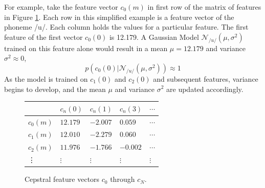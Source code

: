 \DIFdelbegin {}\DIFdelend %
For example, take the feature vector $c_0(m)$ in first row of the matrix of features in Figure \ref{fig:feat-vectors}.  Each row in this simplified example is a feature vector of the phoneme /u/.  Each column holds the values for a particular feature.  The first feature of the first vector $c_0(0)$ is 12.179.  A Gaussian Model $\mathcal{N}_{/u/}(\mu,\sigma^2)$ trained on this feature alone would result in a mean $\mu=12.179$ and variance $\sigma^2\approx 0$, \DIFdelbegin {}\DIFdelend \DIFaddbegin {}\DIFaddend \begin{equation} p(c_0(0)|\mathcal{N}_{/u/}(\mu,\sigma^2))\approx 1 \end{equation} As the model is trained on $c_1(0)$ and $c_2(0)$ and subsequent features, variance begins to develop, and the mean $\mu$ and variance $\sigma^2$ are updated accordingly.
%
\DIFdelbegin %
\DIFdelend \DIFaddbegin \begin{figure}[H]
\DIFaddendFL \begin{center}
\begin{tabular}{|p{1.5cm}|p{1.5cm}|p{1.5cm}|p{1.5cm}|p{1cm}} \hline
    & $c_n(0)$ & $c_n(1)$ & $c_n(3)$ & $\cdots$ \\ \hline
$c_0(m)$ & $12.179$ & $-2.007$ & $0.059$ & $\cdots$ \\ \hline
$c_1(m)$ & $12.010$ & $-2.279$ & $0.060$ & $\cdots$ \\ \hline
$c_2(m)$ & $11.976$ & $-1.766$ & $-0.002$ & $\cdots$ \\ \hline
\vdots & $\vdots$ & $\vdots$ & $\vdots$ & $\vdots$ \\ 
\end{tabular}
\end{center}
\caption{Cepstral feature vectors $c_0$ through $c_N$.}\label{fig:feat-vectors}
\end{figure}


